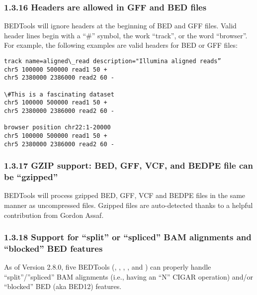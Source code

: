 \documentclass[letterpaper,10pt,english]{sphinxmanual}
\begin{document}
\subsubsection{1.3.16 Headers are allowed in GFF and BED files}
\label{content/overview:headers-are-allowed-in-gff-and-bed-files}
BEDTools will ignore headers at the beginning of BED and GFF files. Valid header lines begin with a
“\#” symbol, the work “track”, or the word “browser”. For example, the following examples are valid
headers for BED or GFF files:

\begin{Verbatim}[commandchars=\\\{\}]
track name=aligned\_read description="Illumina aligned reads”
chr5 100000 500000 read1 50 +
chr5 2380000 2386000 read2 60 -

\#This is a fascinating dataset
chr5 100000 500000 read1 50 +
chr5 2380000 2386000 read2 60 -

browser position chr22:1-20000
chr5 100000 500000 read1 50 +
chr5 2380000 2386000 read2 60 -
\end{Verbatim}


\subsubsection{1.3.17 GZIP support: BED, GFF, VCF, and BEDPE file can be “gzipped”}
\label{content/overview:gzip-support-bed-gff-vcf-and-bedpe-file-can-be-gzipped}
BEDTools will process gzipped BED, GFF, VCF and BEDPE files in the same manner as
uncompressed files. Gzipped files are auto-detected thanks to a helpful contribution from Gordon
Assaf.


\subsubsection{1.3.18 Support for “split” or “spliced” BAM alignments and “blocked” BED features}
\label{content/overview:support-for-split-or-spliced-bam-alignments-and-blocked-bed-features}
As of Version 2.8.0, five BEDTools (, , ,
, and ) can properly handle “split”/”spliced” BAM alignments (i.e., having an
“N” CIGAR operation) and/or “blocked” BED (aka BED12) features.
\end{document}
